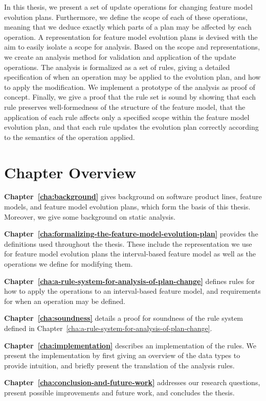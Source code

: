 In this thesis, we present a set of update operations for changing feature model evolution plans. Furthermore, we define the scope of each of these operations, meaning that we deduce exactly which parts of a plan may be affected by each operation. A representation for feature model evolution plans is devised with the aim to easily isolate a scope for analysis. Based on the scope and representations, we create an analysis method for validation and application of the update operations. The analysis is formalized as a set of rules, giving a detailed specification of when an operation may be applied to the evolution plan, and how to apply the modification. We implement a prototype of the analysis as proof of concept. Finally, we give a proof that the rule set is sound by showing that each rule preserves well-formedness of the structure of the feature model, that the application of each rule affects only a specified scope within the feature model evolution plan, and that each rule updates the evolution plan correctly according to the semantics of the operation applied.

\section{Chapter Overview}
\label{sec:chapter-overview}

\textbf{Chapter~\ref{cha:background}} gives background on software product lines, feature models, and feature model evolution plans, which form the basis of this thesis. Moreover, we give some background on static analysis.

\textbf{Chapter~\ref{cha:formalizing-the-feature-model-evolution-plan}} provides the definitions used throughout the thesis. These include the representation we use for feature model evolution plans \textemdash{} the interval-based feature model \textemdash{} as well as the operations we define for modifying them. 

\textbf{Chapter~\ref{cha:a-rule-system-for-analysis-of-plan-change}} defines rules for how to apply the operations to an interval-based feature model, and requirements for when an operation may be defined.

\textbf{Chapter~\ref{cha:soundness}} details a proof for soundness of the rule system defined in Chapter~\ref{cha:a-rule-system-for-analysis-of-plan-change}.

\textbf{Chapter~\ref{cha:implementation}} describes an implementation of the rules. We present the implementation by first giving an overview of the data types to provide intuition, and briefly present the translation of the analysis rules.

\textbf{Chapter~\ref{cha:conclusion-and-future-work}} addresses our research questions, present possible improvements and future work, and concludes the thesis.
